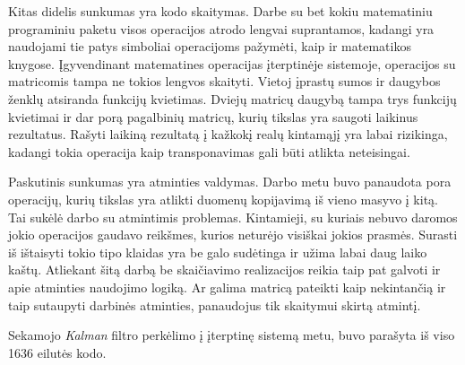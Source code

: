 Kitas didelis sunkumas yra kodo skaitymas.
Darbe su bet kokiu matematiniu programiniu paketu visos operacijos atrodo lengvai suprantamos, kadangi yra naudojami tie patys simboliai operacijoms pažymėti, kaip ir matematikos knygose.
Įgyvendinant matematines operacijas įterptinėje sistemoje, operacijos su matricomis tampa ne tokios lengvos skaityti.
Vietoj įprastų sumos ir daugybos ženklų atsiranda funkcijų kvietimas.
Dviejų matricų daugybą tampa trys funkcijų kvietimai ir dar porą pagalbinių matricų, kurių tikslas yra saugoti laikinus rezultatus.
Rašyti laikiną rezultatą į kažkokį realų kintamąjį yra labai rizikinga, kadangi tokia operacija kaip transponavimas gali būti atlikta neteisingai.

Paskutinis sunkumas yra atminties valdymas.
Darbo metu buvo panaudota pora operacijų, kurių tikslas yra atlikti duomenų kopijavimą iš vieno masyvo į kitą.
Tai sukėlė darbo su atmintimis problemas.
Kintamieji, su kuriais nebuvo daromos jokio operacijos gaudavo reikšmes, kurios neturėjo visiškai jokios prasmės.
Surasti iš ištaisyti tokio tipo klaidas yra be galo sudėtinga ir užima labai daug laiko kaštų.
Atliekant šitą darbą be skaičiavimo realizacijos reikia taip pat galvoti ir apie atminties naudojimo logiką.
Ar galima matricą pateikti kaip nekintančią ir taip sutaupyti darbinės atminties, panaudojus tik skaitymui skirtą atmintį.

Sekamojo \textit{Kalman} filtro perkėlimo į įterptinę sistemą metu, buvo parašyta iš viso 1636 eilutės kodo.





